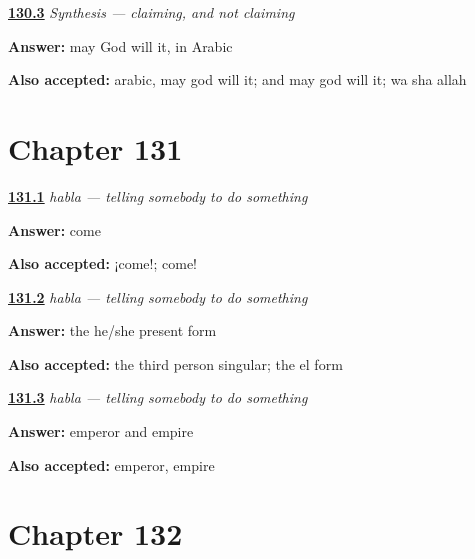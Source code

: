 \noindent\begin{minipage}[t]{\linewidth}
\raggedright
\hyperlink{review-ES-C18-sintesis-subjuntivo-ojala}{\textbf{130.3}} \emph{Synthesis — claiming, and not claiming}\par
\small \textbf{Answer:} may God will it, in Arabic\par
\footnotesize \textbf{Also accepted:} arabic, may god will it; and may god will it; wa sha allah
\end{minipage}\par\medskip

\section*{Chapter 131}

\noindent\begin{minipage}[t]{\linewidth}
\raggedright
\hyperlink{review-ES-C50-habla-say}{\textbf{131.1}} \emph{habla — telling somebody to do something}\par
\small \textbf{Answer:} come\par
\footnotesize \textbf{Also accepted:} ¡come!; come!
\end{minipage}\par\medskip

\noindent\begin{minipage}[t]{\linewidth}
\raggedright
\hyperlink{review-ES-C50-habla-rule}{\textbf{131.2}} \emph{habla — telling somebody to do something}\par
\small \textbf{Answer:} the he/she present form\par
\footnotesize \textbf{Also accepted:} the third person singular; the el form
\end{minipage}\par\medskip

\noindent\begin{minipage}[t]{\linewidth}
\raggedright
\hyperlink{review-ES-C50-habla-emperor}{\textbf{131.3}} \emph{habla — telling somebody to do something}\par
\small \textbf{Answer:} emperor and empire\par
\footnotesize \textbf{Also accepted:} emperor, empire
\end{minipage}\par\medskip

\section*{Chapter 132}

